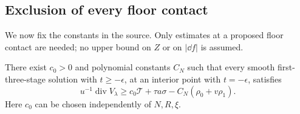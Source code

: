 \subsection{Exclusion of every floor contact}
\label{subsec:fl-floor}

We now fix the constants in the source.  Only estimates at a proposed
floor contact are needed; no upper bound on \(Z\) or on \(\lvert\dd f\rvert\)
is assumed.

\begin{lemma}
\label{lem:fl-floor-ledger}
There exist \(c_0>0\) and polynomial constants \(C_N\) such that
every smooth first-three-stage solution with
\(t\ge-\epsilon\), at an interior point with \(t=-\epsilon\),
satisfies
\begin{equation}
\label{eq:fl-floor-divergence}
 u^{-1}\operatorname{div}V_\lambda
 \ge c_0\mathcal T+\tau a\sigma-C_N(\rho_0+v\rho_1).
\end{equation}
Here \(c_0\) can be chosen independently of \(N,R,\xi\).
\end{lemma}

